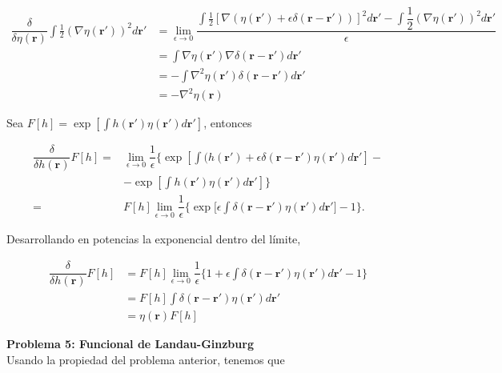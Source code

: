 \documentclass[10pt]{article}
\begin{document}
\begin{align*}
\dfrac{\delta}{\delta \eta(\mathbf{r})}\int \frac{1}{2} \left(\nabla \eta(\mathbf{r'})\right)^2 d\mathbf{r'} &= \lim_{\epsilon \rightarrow 0} \dfrac{ \int \frac{1}{2} \left[\nabla \left(\eta(\mathbf{r'}) + \epsilon \delta(\mathbf{r}-\mathbf{r'})\right)\right]^2 d\mathbf{r'} - \int \dfrac{1}{2} \left(\nabla \eta(\mathbf{r'})\right)^2 d\mathbf{r'} }{\epsilon} \\
&=   \int \nabla \eta(\mathbf{r'})\nabla  \delta(\mathbf{r}-\mathbf{r'}) d\mathbf{r'} \\
&= - \int \nabla^2 \eta(\mathbf{r'}) \delta(\mathbf{r}-\mathbf{r'}) d\mathbf{r'} \\
&= -\nabla^2 \eta(\mathbf{r})
\end{align*}

Sea $F[h] = \exp\left[\int h(\mathbf{r'})\eta(\mathbf{r'}) d\mathbf{r'}\right]$, entonces

\begin{align*}
\dfrac{\delta}{\delta h(\mathbf{r})} F[h] =& \lim_{\epsilon\rightarrow 0} \dfrac{1}{\epsilon}\bigg\lbrace 
\exp\left[\int (h(\mathbf{r'}) + \epsilon \delta(\mathbf{r}-\mathbf{r'}) \eta(\mathbf{r'}) d\mathbf{r'}\right] - \\
&-\exp\left[\int h(\mathbf{r'})\eta(\mathbf{r'}) d\mathbf{r'}\right] \bigg\rbrace \\
=& F[h] \lim_{\epsilon\rightarrow 0} \dfrac{1}{\epsilon}  \bigg\lbrace \exp\bigg[\epsilon \int \delta(\mathbf{r} - \mathbf{r'})\eta(\mathbf{r'}) d\mathbf{r'}\bigg] -1 \bigg\rbrace.
\end{align*}

Desarrollando en potencias la exponencial dentro del l\'imite,

\begin{align*}
\dfrac{\delta}{\delta h(\mathbf{r})} F[h] 
&= F[h] \lim_{\epsilon\rightarrow 0} \dfrac{1}{\epsilon}  \bigg\lbrace 1+ \epsilon \int \delta(\mathbf{r} - \mathbf{r'})\eta(\mathbf{r'}) d\mathbf{r'} - 1\bigg\rbrace \\
&= F[h] \int \delta(\mathbf{r} - \mathbf{r'})\eta(\mathbf{r'}) d\mathbf{r'} \\
&= \eta(\mathbf{r}) F[h] 
\end{align*}

\pagebreak

\textbf{Problema 5: Funcional de Landau-Ginzburg}\\

Usando la propiedad del problema anterior, tenemos que 
\end{document}
